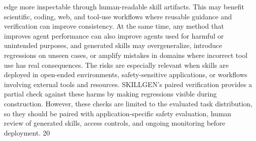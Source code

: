 edge more inspectable through human-readable skill artifacts. This may benefit scientific, coding,
web, and tool-use workflows where reusable guidance and verification can improve consistency.
At the same time, any method that improves agent performance can also improve agents used for
harmful or unintended purposes, and generated skills may overgeneralize, introduce regressions on
unseen cases, or amplify mistakes in domains where incorrect tool use has real consequences. The
risks are especially relevant when skills are deployed in open-ended environments, safety-sensitive
applications, or workflows involving external tools and resources. SKILLGEN’s paired verification
provides a partial check against these harms by making regressions visible during construction.
However, these checks are limited to the evaluated task distribution, so they should be paired with
application-specific safety evaluation, human review of generated skills, access controls, and ongoing
monitoring before deployment.
20

